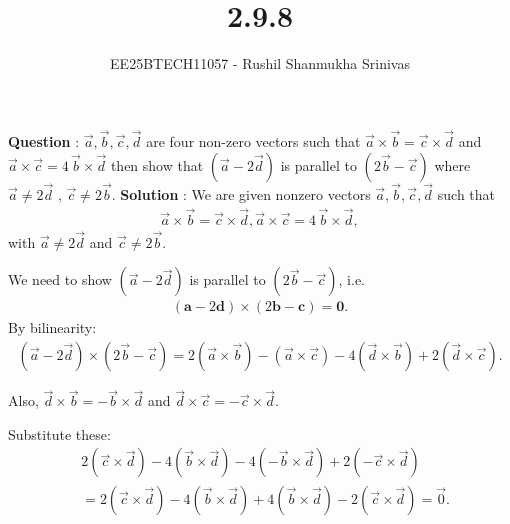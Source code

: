 \documentclass[journal]{IEEEtran}
\begin{document}




\title{2.9.8}
\author{EE25BTECH11057 - Rushil Shanmukha Srinivas
}
{\let\newpage\relax\maketitle}

\renewcommand{\thefigure}{\theenumi}
\renewcommand{\thetable}{\theenumi}
\setlength{\intextsep}{10pt} %

\renewcommand{\thetable}{\theenumi}

\textbf{Question} : $\vec a,\vec b,\vec c ,\vec d $ are four non-zero vectors such that
$\vec a \times \vec b = \vec c \times \vec d$ and $ \vec a \times \vec c = 4\,\vec b \times \vec d$
then show that $(\vec a - 2\vec d)$ is parallel to $(2\vec b - \vec c)$ where $\vec a \neq 2\vec d $ , $\vec c \neq 2\vec b.$
\newline
\textbf{Solution} :
We are given nonzero vectors $\vec a,\vec b,\vec c,\vec d $ such that
\begin{align}
\vec a\times \vec b = \vec c\times \vec d,
\vec a\times \vec c = 4\,\vec b\times \vec d,
\end{align}
with $\vec a\neq 2\vec d$ and $\vec c\neq 2\vec b$.

We need to show $(\vec a- 2\vec d)$ is parallel to $(2\vec b-\vec c)$, i.e.
\begin{align}
(\mathbf a-2\mathbf d)\times(2\mathbf b-\mathbf c)=\mathbf0.
\end{align}
By bilinearity:
\begin{align}
(\vec a-2\vec d)\times(2\vec b-\vec c)
= 2(\vec a\times\vec b) - (\vec a\times\vec c)
 - 4(\vec d\times\vec b) + 2(\vec d\times\vec c).
\end{align}

Also, $\vec d\times\vec b=-\vec b\times\vec d$ and
$\vec d\times\vec c=-\vec c\times\vec d$.

Substitute these:
\begin{align}
&2(\vec c\times\vec d) - 4(\vec b\times\vec d)
   -4(-\vec b\times\vec d) + 2(-\vec c\times\vec d) \\
&= 2(\vec c\times\vec d) - 4(\vec b\times\vec d)
   + 4(\vec b\times\vec d) - 2(\vec c\times\vec d) = \vec 0.
\end{align}
\end{document}
